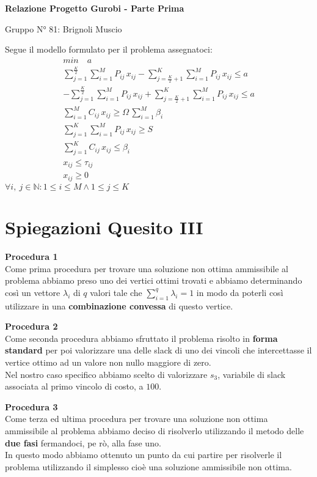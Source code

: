 \documentclass[12pt]{article}
\begin{document}
  \begin{center}
    \Large\textbf{Relazione Progetto Gurobi - Parte Prima}

    \small Gruppo N° 81: Brignoli Muscio
  \end{center}\bigskip

  Segue il modello formulato per il problema assegnatoci:
  \begin{gather*}
    min\quad a \\
    \sum_{j=1}^{\frac{K}{2}}\sum_{i=1}^{M}P_{ij}\,x_{ij}-\sum_{j=\frac{K}{2}+1}^{K}\sum_{i=1}^{M}P_{ij}\,x_{ij}\leq a \\
    -\sum_{j=1}^{\frac{K}{2}}\sum_{i=1}^{M}P_{ij}\,x_{ij}+\sum_{j=\frac{K}{2}+1}^{K}\sum_{i=1}^{M}P_{ij}\,x_{ij}\leq a \\
    \sum_{i=1}^M C_{ij}\,x_{ij}\geq \Omega\,\sum_{i=1}^M\beta_i \\
    \sum_{j=1}^{K}\sum_{i=1}^{M} P_{ij}\,x_{ij}\geq S \\
    \sum_{j=1}^K C_{ij}\,x_{ij}\leq \beta_i \\
    x_{ij}\leq \tau_{ij} \\
    x_{ij}\geq 0
  \end{gather*}
  \hfill$\forall i,\:j\in\mathbb{N}:1\leq i\leq M\wedge1\leq j\leq K$

  \section*{Spiegazioni Quesito III}
  {\Large\bfseries Procedura 1}\\
  Come prima procedura per trovare una soluzione non ottima ammissibile al problema abbiamo preso uno dei vertici ottimi trovati e abbiamo determinando così un vettore $\lambda_i$ di $q$ valori tale che ${\displaystyle\sum_{i=1}^q}\lambda_i=1$ in modo da poterli così utilizzare in una \textbf{combinazione convessa} di questo vertice.\bigskip\bigskip
  
  {\Large\bfseries Procedura 2}\\
  Come seconda procedura abbiamo sfruttato il problema risolto in \textbf{forma standard} per poi valorizzare una delle slack di uno dei vincoli che intercettasse il vertice ottimo ad un valore non nullo maggiore di zero.\\
  Nel nostro caso specifico abbiamo scelto di valorizzare $s_3$, variabile di slack associata al primo vincolo di costo, a $100$.\bigskip\bigskip

  {\Large\bfseries Procedura 3}\\
  Come terza ed ultima procedura per trovare una soluzione non ottima ammissibile al problema abbiamo deciso di risolverlo utilizzando il metodo delle \textbf{due fasi} fermandoci, pe rò, alla fase uno.\\
  In questo modo abbiamo ottenuto un punto da cui partire per risolverle il problema utilizzando il simplesso cioè una soluzione ammissibile non ottima.
\end{document}
